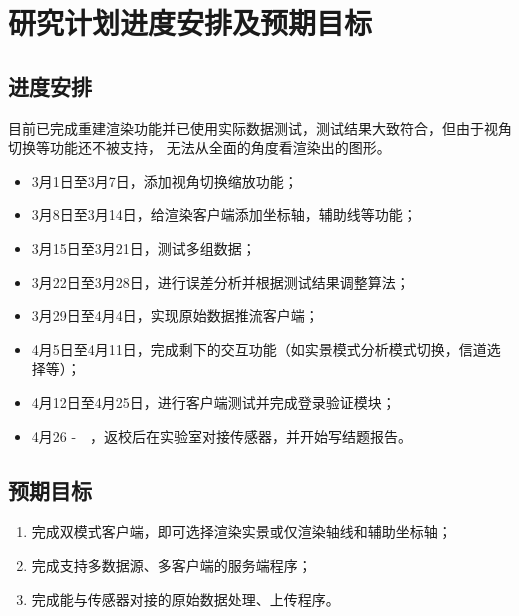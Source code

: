 \section{研究计划进度安排及预期目标}

\subsection{进度安排}

目前已完成重建渲染功能并已使用实际数据测试，测试结果大致符合，但由于视角切换等功能还不被支持，
无法从全面的角度看渲染出的图形。

\begin{itemize}
    \item 3月1日至3月7日，添加视角切换缩放功能；
    \item 3月8日至3月14日，给渲染客户端添加坐标轴，辅助线等功能；
    \item 3月15日至3月21日，测试多组数据；
    \item 3月22日至3月28日，进行误差分析并根据测试结果调整算法；
    \item 3月29日至4月4日，实现原始数据推流客户端；
    \item 4月5日至4月11日，完成剩下的交互功能（如实景模式分析模式切换，信道选择等）；
    \item 4月12日至4月25日，进行客户端测试并完成登录验证模块；
    \item 4月26 -　，返校后在实验室对接传感器，并开始写结题报告。
\end{itemize}

\subsection{预期目标}

\begin{enumerate}
    \item 完成双模式客户端，即可选择渲染实景或仅渲染轴线和辅助坐标轴；
    \item 完成支持多数据源、多客户端的服务端程序；
    \item 完成能与传感器对接的原始数据处理、上传程序。
\end{enumerate}